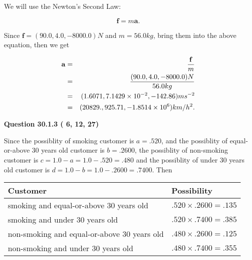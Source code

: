 \documentclass[12pt]{article}
\begin{document}
 
 
 
 
\noindent{}

We will use the Newton's Second Law:
 
\[
\mathbf{f}=m\mathbf{a}.
\]
 
Since $\mathbf{f}=( %
90.0,  %
4.0,  %
-8000.0 )N$
and $m= %
56.0 kg$, bring them into the above equation, then we get
 
\begin{eqnarray*}
\mathbf{a}&=&\frac{\mathbf{f}}m  \\
&=&\frac{(
90.0 ,
4.0 ,
-8000.0 )N
}{ %
56.0 kg}  \\
&=&(
1.6071 ,
7.1429 \times 10^{-2},
-142.86
)ms^{-2} \\
&=&(
20829. ,
925.71 ,
-1.8514 \times 10^{6}
)km/h^2.
\end{eqnarray*}
 
 
 
  
\vspace{0.2in}
  
{\textbf{\Large{Question
30.1.3 
 (          6,         12,         27)
}}}
  
  
 
 
\noindent{}

Since the possiblity of  %
smoking customer is $ a =  %
.520 $,
and the possiblity of  %
equal-or-above 30 years old customer is $ b =  %
.2600 $,
the possiblity of  %
non-smoking customer is $ c = 1.0 - a = 1.0 -
.520
=  %
.480 $ and the possiblity of  %
under 30 years old
customer is $ d = 1.0 - b = 1.0 -  %
.2600 =  %
.7400  $.
Then
 
\noindent
\begin{tabular}{|l|l|}
\hline
Customer & Possibility \\
\hline
smoking  and  %
equal-or-above 30 years old  &
  $ %
.520 \times  %
.2600 =  %
.135$ \\
\hline
smoking  and  %
under 30 years old &
  $ %
.520 \times  %
.7400 =  %
.385$ \\
\hline
 non-smoking and  %
equal-or-above 30 years old  &
  $ %
.480 \times  %
.2600 =  %
.125$ \\
\hline
 non-smoking and  %
under 30 years old &
  $ %
.480 \times  %
.7400 =  %
.355$ \\
\hline
\end{tabular}
 
\end{document}
